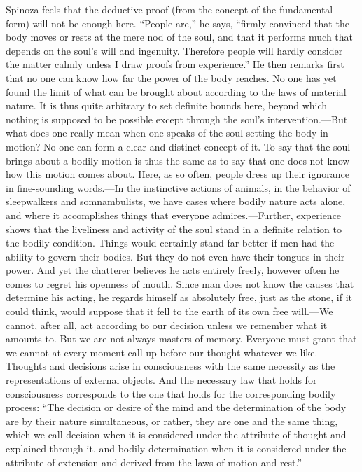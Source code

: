 \documentclass[12pt]{book}
\newcommand{\opage}[1]{\marginnote{\footnotesize\textit{[#1]}}}
\begin{document}
Spinoza feels that the deductive proof (from the concept of the fundamental form) will
not be enough here. ``People are,'' he says, ``firmly convinced that the body moves or
rests at the mere nod of the soul, and that it performs much that depends on the soul's
will and ingenuity. Therefore people will hardly consider the matter calmly unless I
draw proofs from experience.'' He then remarks first that no one can know how far the
power of the body reaches. No one has yet found the limit of what can be brought about
according to the laws of material nature. It is thus quite arbitrary to set definite
bounds here, beyond which nothing is supposed to be possible except through the soul's
intervention.---But what does one really mean when one speaks of the soul setting the
body in motion? No one can form a clear and distinct concept of it. To say that the soul
brings about a bodily motion is thus the same as to \opage{96}say that one does not
know how this motion comes about. Here, as so often, people dress up their ignorance in
fine-sounding words.---In the instinctive actions of animals, in the behavior of
sleepwalkers and somnambulists, we have cases where bodily nature acts alone, and where
it accomplishes things that everyone admires.---Further, experience shows that the
liveliness and activity of the soul stand in a definite relation to the bodily
condition. Things would certainly stand far better if men had the ability to govern
their bodies. But they do not even have their tongues in their power. And yet the
chatterer believes he acts entirely freely, however often he comes to regret his
openness of mouth. Since man does not know the causes that determine his acting, he
regards himself as absolutely free, just as the stone, if it could think, would suppose
that it fell to the earth of its own free will.---We cannot, after all, act according
to our decision unless we remember what it amounts to. But we are not always masters
of memory. Everyone must grant that we cannot at every moment call up before our
thought whatever we like. Thoughts and decisions arise in consciousness with the same
necessity as the representations of external objects. And the necessary law that holds
for consciousness corresponds to the one that holds for the corresponding bodily
process: ``The decision or desire of the mind and the determination of the body are by
their nature simultaneous, or rather, they are one and the same thing, which we call
decision when it is considered under the attribute of thought and explained through it,
and bodily determination when \opage{97}it is considered under the attribute of extension
and derived from the laws of motion and rest.''
\end{document}
